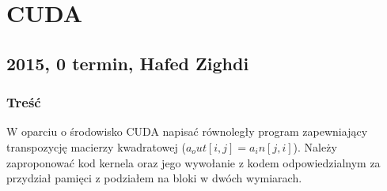 \newpage
\section{CUDA}
	\subsection{2015, 0 termin, Hafed Zighdi}
		\subsubsection{Treść}
			W oparciu o środowisko CUDA napisać równoległy program zapewniający transpozycję macierzy kwadratowej ($ a_out[ i,j ] = a_in [ j,i ] $). Należy zaproponować kod kernela oraz jego wywołanie z kodem odpowiedzialnym za przydział pamięci z podziałem na bloki w dwóch wymiarach.
